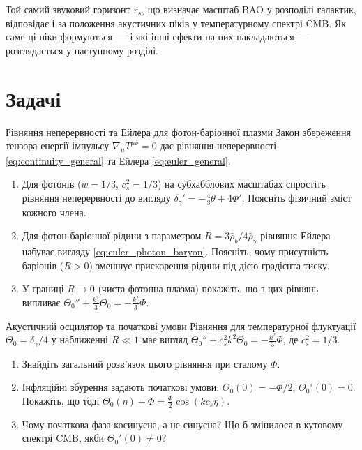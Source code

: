 Той самий звуковий горизонт $r_s$, що визначає масштаб
BAO у розподілі галактик, відповідає і за положення
акустичних піків у температурному спектрі CMB. Як саме
ці піки формуються~--- і які інші ефекти на них
накладаються~--- розглядається у наступному розділі.

\section*{Задачі}

\begin{problem}{Рівняння неперервності та Ейлера для фотон-баріонної плазми}
Закон збереження тензора енергії-імпульсу $\nabla_\mu T^{\mu\nu}=0$ дає
рівняння неперервності \eqref{eq:continuity_general} та Ейлера \eqref{eq:euler_general}.

\begin{enumerate}
    \item Для фотонів ($w=1/3$, $c_s^2=1/3$) на субхабблових масштабах
          спростіть рівняння неперервності до вигляду $\delta_\gamma' = -\frac{4}{3}\theta + 4\Phi'$.
          Поясніть фізичний зміст кожного члена.
    \item Для фотон-баріонної рідини з параметром $R = 3\bar\rho_b/4\bar\rho_\gamma$
          рівняння Ейлера набуває вигляду \eqref{eq:euler_photon_baryon}.
          Поясніть, чому присутність баріонів ($R>0$) зменшує прискорення
          рідини під дією градієнта тиску.
    \item У границі $R \to 0$ (чиста фотонна плазма) покажіть, що з цих рівнянь
          випливає $\Theta_0'' + \frac{k^2}{3}\Theta_0 = -\frac{k^2}{3}\Phi$.
\end{enumerate}
\end{problem}


\begin{problem}{Акустичний осцилятор та початкові умови}
Рівняння для температурної флуктуації $\Theta_0 = \delta_\gamma/4$ у наближенні
$R \ll 1$ має вигляд $\Theta_0'' + c_s^2 k^2 \Theta_0 = -\frac{k^2}{3}\Phi$,
де $c_s^2 = 1/3$.

\begin{enumerate}
    \item Знайдіть загальний розв'язок цього рівняння при сталому $\Phi$.
    \item Інфляційні збурення задають початкові умови: $\Theta_0(0) = -\Phi/2$,
          $\Theta_0'(0) = 0$. Покажіть, що тоді $\Theta_0(\eta) + \Phi = \frac{\Phi}{2}\cos(k c_s \eta)$.
    \item Чому початкова фаза косинусна, а не синусна? Що б змінилося в кутовому
          спектрі CMB, якби $\Theta_0'(0) \neq 0$?
\end{enumerate}
\end{problem}

